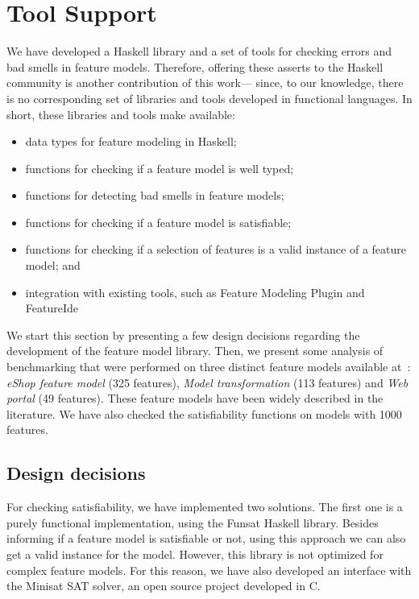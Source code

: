 \section{Tool Support}\label{sec:tool-support}

We have developed a Haskell library and a set of tools for checking errors and bad smells in feature models. Therefore, offering these asserts to the Haskell community is another contribution of this work--- since, to our knowledge, there is no corresponding set of libraries and tools developed in functional languages. In short, these libraries and tools make available:

\begin{itemize}
 \item data types for feature modeling in Haskell;
 \item functions for checking if a feature model is well typed;
 \item functions for detecting bad smells in feature models;
 \item functions for checking if a feature model is satisfiable;
 \item functions for checking if a selection of features is a valid instance of a feature model; and
 \item integration with existing tools, such as Feature Modeling Plugin and FeatureIde 
\end{itemize}   

We start this section by presenting a few design decisions regarding the development of the feature model library. Then, we present some analysis of benchmarking that were performed on three distinct feature models available at~\cite{Group:2009yg}: \emph{eShop feature model} (325 features), \emph{Model transformation} (113 features) and \emph{Web portal} (49 features). These feature models have been widely described in the literature. We have also checked the satisfiability functions on models with 1000 features. 

\subsection{Design decisions}

For checking satisfiability, we have implemented two solutions. The first one is a purely functional implementation, using the Funsat Haskell library. Besides informing if a feature model is satisfiable or not, using this approach we can also get a valid instance for the model. However, this library is not optimized for complex feature models. For this reason, we have also developed an interface with the Minisat SAT solver, an open source project developed in C.    

